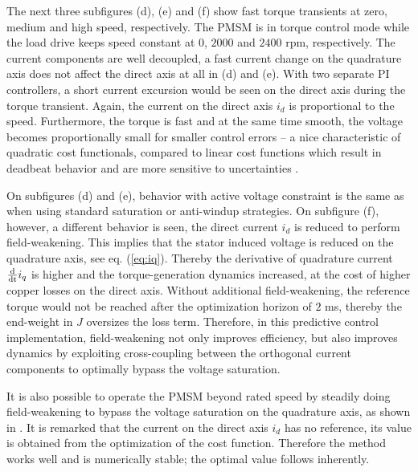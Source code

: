 \documentclass[a4paper,11pt,fleqn]{article}
\newcommand{\ddt}{\frac{\textnormal{d}}{\textnormal{dt}}}
\begin{document}
The next three subfigures (d), (e) and (f) show fast torque transients at zero, medium and high speed, respectively. The PMSM is in torque control mode while the load drive keeps speed constant at $0$, $2000$ and $2400$ rpm, respectively. The current components are well decoupled, a fast current change on the quadrature axis does not affect the direct axis at all in (d) and (e). With two separate PI controllers, a short current excursion would be seen on the direct axis during the torque transient. Again, the current on the direct axis $i_d$ is proportional to the speed. Furthermore, the torque is fast and at the same time smooth, the voltage becomes proportionally small for smaller control errors -- a nice characteristic of quadratic cost functionals, compared to linear cost functions which result in deadbeat behavior and are more sensitive to uncertainties \cite{Moon}. 

On subfigures (d) and (e), behavior with active voltage constraint is the same as when using standard saturation or anti-windup strategies. On subfigure (f), however, a different behavior is seen, the direct current $i_d$ is reduced to perform field-weakening. This implies that the stator induced voltage is reduced on the quadrature axis, see eq. (\ref{eq:iq}). Thereby the derivative of quadrature current $\ddt i_q$ is higher and the torque-generation dynamics increased, at the cost of higher copper losses on the direct axis. Without additional field-weakening, the reference torque would not be reached after the optimization horizon of $2$ ms, thereby the end-weight in $J$ oversizes the loss term. Therefore, in this predictive control implementation, field-weakening not only improves efficiency, but also improves dynamics by exploiting cross-coupling between the orthogonal current components to optimally bypass the voltage saturation. 

It is also possible to operate the PMSM beyond rated speed by steadily doing field-weakening to bypass the voltage saturation on the quadrature axis, as shown in \cite{inhFW}. It is remarked that the current on the direct axis $i_d$ has no reference, its value is obtained from the optimization of the cost function. Therefore the method works well and is numerically stable; the optimal value follows inherently.
\end{document}

